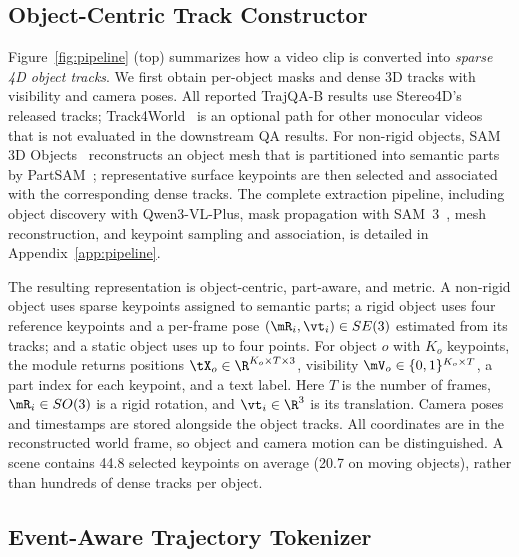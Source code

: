 \subsection{Object-Centric Track Constructor}
\label{sec:repr}

Figure~\ref{fig:pipeline} (top) summarizes how a video clip is converted into
\emph{sparse 4D object tracks}.
We first obtain per-object masks and dense 3D tracks with visibility and camera poses. All reported TrajQA-B results use Stereo4D's released tracks; Track4World~\citep{luTrack4WorldFeedforwardWorldcentric2026} is an optional path for other monocular videos that is not evaluated in the downstream QA results. For non-rigid objects, SAM 3D Objects~\citep{sam3dteam2025sam3d3dfyimages} reconstructs an object mesh that is partitioned into semantic parts by PartSAM~\citep{zhuPartSAMScalablePromptable2026};
representative surface keypoints are then selected and associated with the corresponding dense tracks. The complete extraction pipeline, including object discovery with Qwen3-VL-Plus,
mask propagation with SAM~3~\citep{ICLR2026_e0982cbc}, mesh reconstruction, and keypoint sampling and association, is detailed in Appendix~\ref{app:pipeline}.

The resulting representation is object-centric, part-aware, and metric. A non-rigid object uses sparse keypoints assigned to semantic parts; a rigid object uses four reference keypoints and a per-frame pose $(\mR_i,\vt_i)\in SE(3)$ estimated from its tracks; and a static object uses up to four points. For object $o$ with $K_o$ keypoints, the module returns positions $\tX_o\in\R^{K_o\times T\times 3}$, visibility $\mV_o\in\{0,1\}^{K_o\times T}$, a part index for each keypoint, and a text label. Here $T$ is the number of frames, $\mR_i\in SO(3)$ is a rigid rotation, and $\vt_i\in\R^3$ is its translation. Camera poses and timestamps are stored alongside the object tracks. All coordinates are in the reconstructed world frame, so object and camera motion can be distinguished. A scene contains 44.8 selected keypoints on average (20.7 on moving objects), rather than hundreds of dense tracks per object.

\subsection{Event-Aware Trajectory Tokenizer}
\label{sec:token}

